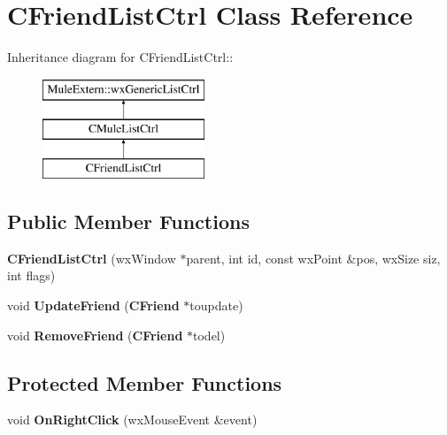 \section{CFriendListCtrl Class Reference}
\label{classCFriendListCtrl}
Inheritance diagram for CFriendListCtrl::\begin{figure}[H]
\begin{center}
\leavevmode
\includegraphics[height=3cm]{classCFriendListCtrl}
\end{center}
\end{figure}
\subsection*{Public Member Functions}
\begin{DoxyCompactItemize}
\item 
{\bfseries CFriendListCtrl} (wxWindow $\ast$parent, int id, const wxPoint \&pos, wxSize siz, int flags)\label{classCFriendListCtrl_aab46a2da50b4d23829c8f81f78d9fcaf}

\item 
void {\bfseries UpdateFriend} ({\bf CFriend} $\ast$toupdate)\label{classCFriendListCtrl_aebc440a345288dbcf577613a6093878b}

\item 
void {\bfseries RemoveFriend} ({\bf CFriend} $\ast$todel)\label{classCFriendListCtrl_a19604bef415e6f77df62b7f0ce23af75}

\end{DoxyCompactItemize}
\subsection*{Protected Member Functions}
\begin{DoxyCompactItemize}
\item 
void {\bfseries OnRightClick} (wxMouseEvent \&event)\label{classCFriendListCtrl_ae74579699f890196f0a6508c2a2fa80f}

\end{DoxyCompactItemize}
